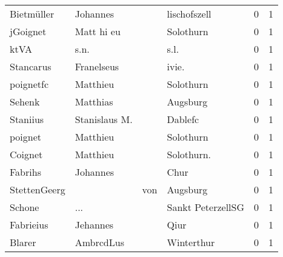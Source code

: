 \documentclass[10pt,a4paper,landscape]{article}
\begin{document}
\begin{longtable}{llllrr}
               Bietmüller &                           Johannes &             &                                lischofszell &          0 &         1 \\
                 jGoignet &                         Matt hi eu &             &                                   Solothurn &          0 &         1 \\
                     ktVA &                               s.n. &             &                                        s.l. &          0 &         1 \\
                Stancarus &                         Franelseus &             &                                      ivie.  &          0 &         1 \\
                poignetfc &                           Matthieu &             &                                   Solothurn &          0 &         1 \\
                   Sehenk &                           Matthias &             &                                    Augsburg &          0 &         1 \\
                 Staniius &                      Stanislaus M. &             &                                     Dablefc &          0 &         1 \\
                  poignet &                           Matthieu &             &                                   Solothurn &          0 &         1 \\
                  Coignet &                           Matthieu &             &                                 Solothurn.  &          0 &         1 \\
                  Fabrihs &                           Johannes &             &                                        Chur &          0 &         1 \\
             StettenGeerg &                                    &         von &                                    Augsburg &          0 &         1 \\
                   Schone &                                ... &             &                           Sankt PeterzellSG &          0 &         1 \\
                Fabrieius &                           Jehannes &             &                                        Qiur &          0 &         1 \\
                   Blarer &                          AmbrcdLus &             &                                  Winterthur &          0 &         1 \\

\end{longtable}
\end{document}
